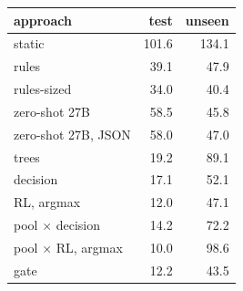 \begin{tabular}{@{}lrr@{}}
\toprule
approach & test & unseen \\
\midrule
static & 101.6 & 134.1 \\
rules & 39.1 & 47.9 \\
rules-sized & 34.0 & 40.4 \\
zero-shot 27B & 58.5 & 45.8 \\
zero-shot 27B, JSON & 58.0 & 47.0 \\
trees & 19.2 & 89.1 \\
decision & 17.1 & 52.1 \\
RL, argmax & 12.0 & 47.1 \\
pool $\times$ decision & 14.2 & 72.2 \\
pool $\times$ RL, argmax & 10.0 & 98.6 \\
gate & 12.2 & 43.5 \\
\bottomrule
\end{tabular}
